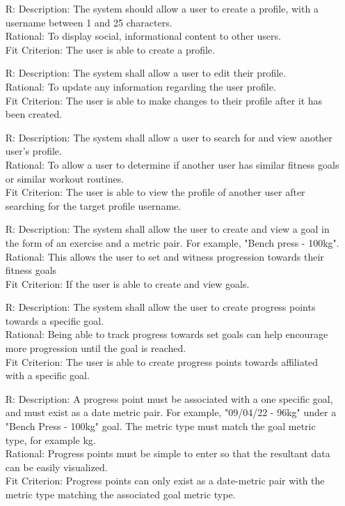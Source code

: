 \documentclass[12pt]{article}
\newcounter{reqnum} %
\begin{document}
\begin{itemize}
\item[R\refstepcounter{reqnum}\thereqnum \label{R_Inputs}:]
Description: The system should allow a user to create a profile, with a username between 1 and 25 characters.
\\ Rational: To display social, informational content to other users.
\\ Fit Criterion: The user is able to create a profile.

\item[R\refstepcounter{reqnum}\thereqnum \label{R_Inputs}:]
Description: The system shall allow a user to edit their profile.
\\ Rational: To update any information regarding the user profile.
\\ Fit Criterion: The user is able to make changes to their profile after it has been created. 

\item[R\refstepcounter{reqnum}\thereqnum \label{R_Inputs}:]
Description: The system shall allow a user to search for and view another user's profile.
\\ Rational: To allow a user to determine if another user has similar fitness goals or similar workout routines.
\\ Fit Criterion: The user is able to view the profile of another user after searching for the target profile username.

\item[R\refstepcounter{reqnum}\thereqnum \label{R_Inputs}:]
Description: The system shall allow the user to create and view a goal in the form of an exercise and a metric pair. For example, "Bench press - 100kg".
\\ Rational: This allows the user to set and witness progression towards their fitness goals
\\ Fit Criterion: If the user is able to create and view goals.

\item[R\refstepcounter{reqnum}\thereqnum \label{R_Inputs}:]
Description: The system shall allow the user to create progress points towards a specific goal.
\\ Rational: Being able to track progress towards set goals can help encourage more progression until the goal is reached.
\\ Fit Criterion: The user is able to create progress points towards affiliated with a specific goal.

\item[R\refstepcounter{reqnum}\thereqnum \label{R_Inputs}:]
Description: A progress point must be associated with a one specific goal, and must exist as a date metric pair. For example, "09/04/22 - 96kg" under a "Bench Press - 100kg" goal. The metric type must match the goal metric type, for example kg.
\\ Rational: Progress points must be simple to enter so that the resultant data can be easily visualized.
\\ Fit Criterion: Progress points can only exist as a date-metric pair with the metric type matching the associated goal metric type.


\end{itemize}
\end{document}
